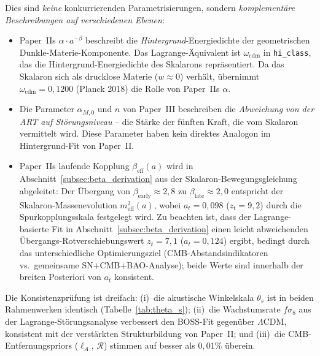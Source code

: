 \documentclass[11pt,a4paper]{article}
\begin{document}
Dies sind \textit{keine} konkurrierenden Parametrisierungen, sondern \textit{komplement\"are Beschreibungen auf verschiedenen Ebenen}:
\begin{itemize}
\item Paper~IIs $\alpha \cdot a^{-\beta}$ beschreibt die \textit{Hintergrund}-Energiedichte der geometrischen Dunkle-Materie-Komponente. Das Lagrange-\"Aquivalent ist $\omega_{\mathrm{cdm}}$ in \texttt{hi\_class}, das die Hintergrund-Energiedichte des Skalarons repr\"asentiert. Da das Skalaron sich als drucklose Materie ($w \approx 0$) verh\"alt, \"ubernimmt $\omega_{\mathrm{cdm}} = 0{,}1200$ (Planck 2018) die Rolle von Paper~IIs $\alpha$.
\item Die Parameter $\alpha_{M,0}$ und $n$ von Paper~III beschreiben die \textit{Abweichung von der ART auf St\"orungsniveau} -- die St\"arke der f\"unften Kraft, die vom Skalaron vermittelt wird. Diese Parameter haben kein direktes Analogon im Hintergrund-Fit von Paper~II.
\item Paper~IIs laufende Kopplung $\beta_{\mathrm{eff}}(a)$ wird in Abschnitt~\ref{subsec:beta_derivation} aus der Skalaron-Bewegungsgleichung abgeleitet: Der \"Ubergang von $\beta_{\mathrm{early}} \approx 2{,}8$ zu $\beta_{\mathrm{late}} \approx 2{,}0$ entspricht der Skalaron-Massenevolution $m_{\mathrm{eff}}^2(a)$, wobei $a_t = 0{,}098$ ($z_t = 9{,}2$) durch die Spurkopplungsskala festgelegt wird. Zu beachten ist, dass der Lagrange-basierte Fit in Abschnitt~\ref{subsec:beta_derivation} einen leicht abweichenden \"Ubergangs-Rotverschiebungswert $z_t = 7{,}1$ ($a_t = 0{,}124$) ergibt, bedingt durch das unterschiedliche Optimierungsziel (CMB-Abstandsindikatoren vs.\ gemeinsame SN+CMB+BAO-Analyse); beide Werte sind innerhalb der breiten Posteriori von $a_t$ konsistent.
\end{itemize}

Die Konsistenzpr\"ufung ist dreifach: (i)~die akustische Winkelskala $\theta_s$ ist in beiden Rahmenwerken identisch (Tabelle~\ref{tab:theta_s}); (ii)~die Wachstumsrate $f\sigma_8$ aus der Lagrange-St\"orungsanalyse verbessert den BOSS-Fit gegen\"uber $\Lambda$CDM, konsistent mit der verst\"arkten Strukturbildung von Paper~II; und (iii)~die CMB-Entfernungspriors ($\ell_A$, $\mathcal{R}$) stimmen auf besser als $0{,}01\%$ \"uberein.
\end{document}
